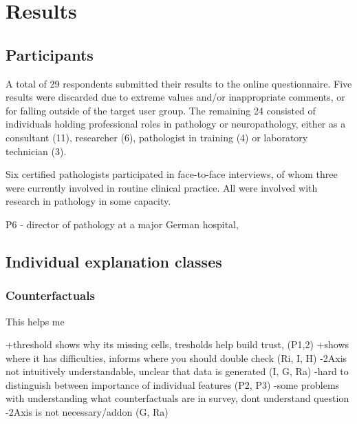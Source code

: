 \section{Results}
\label{sec:results}


\subsection{Participants}

A total of 29 respondents submitted their results to the online questionnaire. Five results were discarded due to extreme values and/or inappropriate comments, or for falling outside of the target user group. The remaining 24 consisted of individuals holding professional roles in pathology or neuropathology, either as a consultant (11), researcher (6), pathologist in training (4) or laboratory technician (3).

Six certified pathologists participated in face-to-face interviews, of whom three were currently involved in routine clinical practice. All were involved with research in pathology in some capacity.


P6 - director of pathology at a major German hospital, 


\subsection{Individual explanation classes}

\subsubsection{Counterfactuals}

This helps me 

+threshold shows why its missing cells, tresholds help build trust,  (P1,2)
+shows where it has difficulties, informs where you should double check (Ri, I, H)
-2Axis not intuitively understandable, unclear that data is generated (I, G, Ra)
-hard to distinguish between importance of individual features (P2, P3)
-some problems with understanding what counterfactuals are in survey, dont understand question
-2Axis is not necessary/addon (G, Ra)

